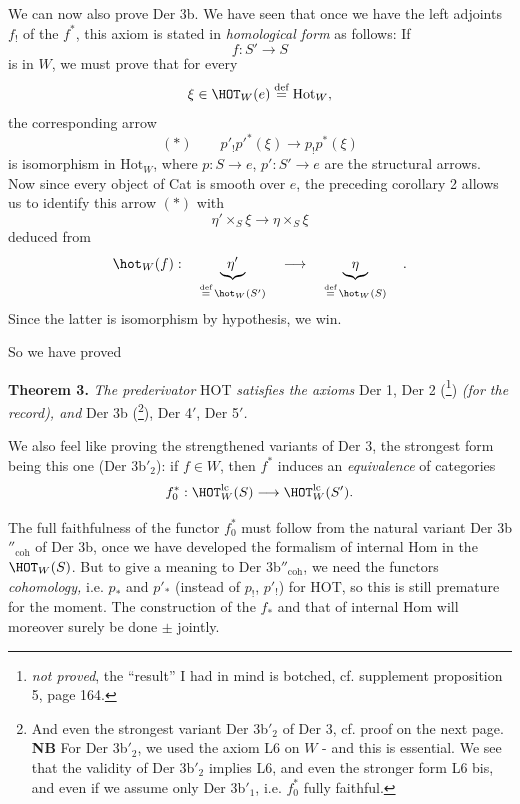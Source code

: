 We can now also prove Der 3b. We have seen that once we have the left adjoints $f_!$ of the $f^*$, this axiom is stated in \textit{homological form} as follows: If
\[f : S'\longrightarrow S\]
is in $W$, we must prove that for every
\[\xi\in\HOT_W(e)\overset{\text{def}}{=}\mathrm{Hot}_W,\]
the corresponding arrow
\[(*)\qquad p'_!p'^*(\xi)\longrightarrow p_!p^*(\xi)\]
is isomorphism in $\mathrm{Hot}_W$, where $p : S\longrightarrow e$, $p' : S'\longrightarrow e$ are the structural arrows. Now since every object of Cat is smooth over $e$, the preceding corollary 2 allows us to identify this arrow $(*)$ with
\[\eta'\times_S\xi\longrightarrow\eta\times_S\xi\]
deduced from
\[\hot_W(f) :\quad\underbrace{\ \eta'\ }_{\overset{\text{def}}{=}\,\hot_W(S')}\quad\longrightarrow\quad\underbrace{\ \eta\ }_{\overset{\text{def}}{=}\,\hot_W(S)}\quad.\]
Since the latter is isomorphism by hypothesis, we win.

So we have proved

\textbf{Theorem 3.} \textit{The prederivator} HOT \textit{satisfies the axioms} Der 1, Der 2 (\footnote[76]{\textit{not proved}, the ``result'' I had in mind is botched, cf. supplement proposition 5, page 164.}) \textit{(for the record), and} Der 3b (\footnote[77]{And even the strongest variant Der 3b$'_2$ of Der 3, cf. proof on the next page. \textbf{NB} For Der 3b$'_2$, we used the axiom L6 on $W$ - and this is essential. We see that the validity of Der 3b$'_2$ implies L6, and even the stronger form L6 bis, and even if we assume only Der 3b$'_1$, i.e. $f_0^*$ fully faithful.}), Der 4$'$, Der 5$'$\textit{.} %

We also feel like proving the strengthened variants of Der 3, the strongest form being this one (Der 3b$'_2$): if $f\in W$, then $f^*$ induces an \textit{equivalence} of categories
\[f_0^* : \HOT^{\mathrm{lc}}_W(S)\longrightarrow\HOT^{\mathrm{lc}}_W(S').\]

The full faithfulness of the functor $f_0^*$ must follow from the natural variant Der 3b$''_{\mathrm{coh}}$ of Der 3b, once we have developed the formalism of internal Hom in the $\HOT_W(S)$. But to give a meaning to Der 3b$''_{\mathrm{coh}}$, we need the functors \textit{cohomology,} i.e. $p_*$ and $p'_*$ (instead of $p_!$, $p'_!$) for HOT, so this is still premature for the moment. The construction of the $f_*$ and that of internal Hom will moreover surely be done $\pm$ jointly.

